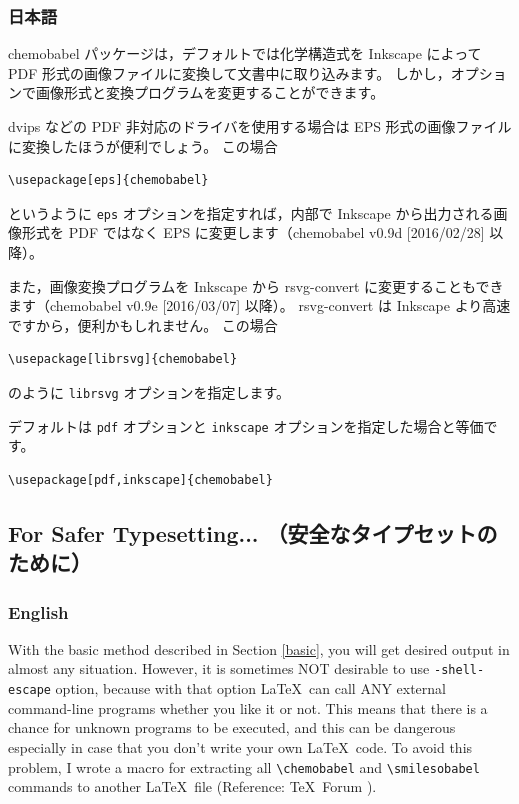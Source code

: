 \documentclass[12pt]{jsarticle}
\begin{document}
\clearpage

\subsubsection{日本語}

\textsf{chemobabel} パッケージは，デフォルトでは化学構造式を Inkscape によって PDF 形式の画像ファイルに変換して文書中に取り込みます。
しかし，オプションで画像形式と変換プログラムを変更することができます。

dvips などの PDF 非対応のドライバを使用する場合は EPS 形式の画像ファイルに変換したほうが便利でしょう。
この場合
\begin{verbatim}
\usepackage[eps]{chemobabel}
\end{verbatim}
というように \verb|eps| オプションを指定すれば，内部で Inkscape から出力される画像形式を PDF ではなく EPS に変更します（\textsf{chemobabel} v0.9d [2016/02/28] 以降）。

また，画像変換プログラムを Inkscape から rsvg-convert に変更することもできます（\textsf{chemobabel} v0.9e [2016/03/07] 以降）。
rsvg-convert は Inkscape より高速ですから，便利かもしれません。
この場合
\begin{verbatim}
\usepackage[librsvg]{chemobabel}
\end{verbatim}
のように \verb|librsvg| オプションを指定します。

デフォルトは \verb|pdf| オプションと \verb|inkscape| オプションを指定した場合と等価です。
\begin{verbatim}
\usepackage[pdf,inkscape]{chemobabel}
\end{verbatim}

\clearpage

\subsection{For Safer Typesetting... （安全なタイプセットのために）} \label{extract}

\subsubsection{English}

With the basic method described in Section \ref{basic}, you will get desired output in almost any situation.
However, it is sometimes NOT desirable to use \verb|-shell-escape| option,
because with that option \LaTeX\ can call ANY external command-line programs whether you like it or not.
This means that there is a chance for unknown programs to be executed,
and this can be dangerous especially in case that you don't write your own \LaTeX\ code.
To avoid this problem, I wrote a macro for extracting all \verb|\chemobabel| and \verb|\smilesobabel| commands to another \LaTeX\ file (Reference: \TeX\ Forum \cite{OKU}).
\end{document}
